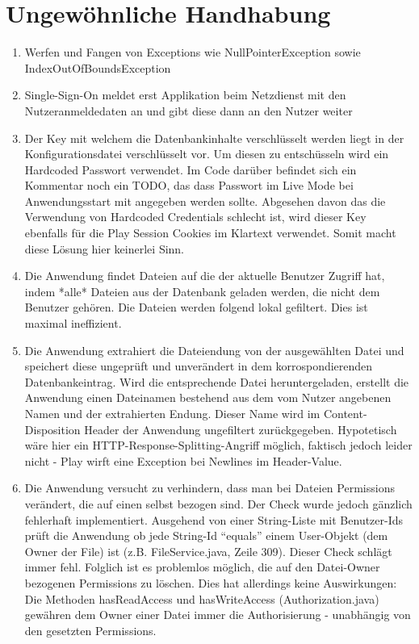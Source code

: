 \documentclass[12pt,DIV14,BCOR10mm,a4paper,parskip=half-,headsepline,headinclude,english,ngerman,bibliography=totocnumbered]{scrreprt}
\begin{document}
\chapter{Ungewöhnliche Handhabung}

\begin{enumerate}[resume]
  \item Werfen und Fangen von Exceptions wie NullPointerException sowie IndexOutOfBoundsException
  \item Single-Sign-On meldet erst Applikation beim Netzdienst mit den Nutzeranmeldedaten an und gibt diese dann an den Nutzer weiter
  \item Der Key mit welchem die Datenbankinhalte verschlüsselt werden liegt in der Konfigurationsdatei verschlüsselt vor. Um diesen zu entschüsseln wird ein Hardcoded Passwort verwendet. Im Code darüber befindet sich ein Kommentar noch ein TODO, das dass Passwort im Live Mode bei Anwendungsstart mit angegeben werden sollte. Abgesehen davon das die Verwendung von Hardcoded Credentials schlecht ist, wird dieser Key ebenfalls für die Play Session Cookies im Klartext verwendet. Somit macht diese Lösung hier keinerlei Sinn.
  \item Die Anwendung findet Dateien auf die der aktuelle Benutzer Zugriff hat, indem *alle* Dateien aus der Datenbank geladen werden, die nicht dem Benutzer gehören. Die Dateien werden folgend lokal gefiltert. Dies ist maximal ineffizient.
  \item Die Anwendung extrahiert die Dateiendung von der ausgewählten Datei und speichert diese ungeprüft und unverändert in dem korrospondierenden Datenbankeintrag. Wird die entsprechende Datei heruntergeladen, erstellt die Anwendung einen Dateinamen bestehend aus dem vom Nutzer angebenen Namen und der extrahierten Endung. Dieser Name wird im Content-Disposition Header der Anwendung ungefiltert zurückgegeben. Hypotetisch wäre hier ein HTTP-Response-Splitting-Angriff möglich, faktisch jedoch leider nicht - Play wirft eine Exception bei Newlines im Header-Value.
  \item Die Anwendung versucht zu verhindern, dass man bei Dateien Permissions verändert, die auf einen selbst bezogen sind. Der Check wurde jedoch gänzlich fehlerhaft implementiert. Ausgehend von einer String-Liste mit Benutzer-Ids prüft die Anwendung ob jede String-Id \enquote{equals} einem User-Objekt (dem Owner der File) ist (z.B. FileService.java, Zeile 309). Dieser Check schlägt immer fehl. Folglich ist es problemlos möglich, die auf den Datei-Owner bezogenen Permissions zu löschen. Dies hat allerdings keine Auswirkungen: Die Methoden hasReadAccess und hasWriteAccess (Authorization.java) gewähren dem Owner einer Datei immer die Authorisierung - unabhängig von den gesetzten Permissions.

\end{enumerate}
\end{document}
